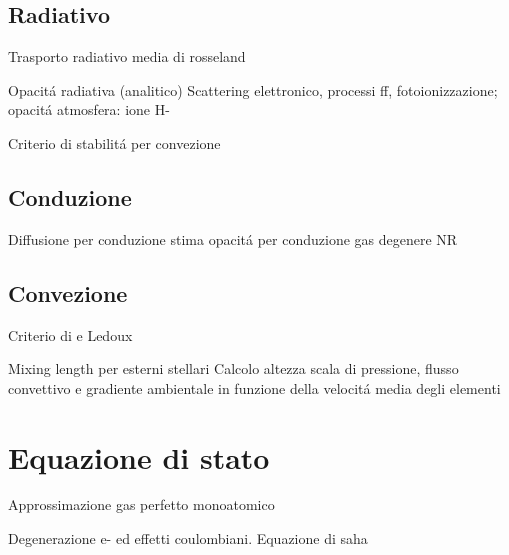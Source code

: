 \subsection{Radiativo}

\begin{frame}{Trasporto radiativo}
media di rosseland
\end{frame}

\begin{frame}{Opacit\'a radiativa (analitico)}
Scattering elettronico, processi ff, fotoionizzazione; opacit\'a atmosfera: ione H-
\end{frame}

\begin{frame}{Criterio di stabilit\'a per convezione}

\end{frame}

\subsection{Conduzione}

\begin{frame}{Diffusione per conduzione}
stima opacit\'a per conduzione gas degenere NR
\end{frame}

\subsection{Convezione}

\begin{frame}{Criterio di \sch e Ledoux}

\end{frame}

\begin{frame}{Mixing length per esterni stellari}
Calcolo altezza scala di pressione, flusso convettivo e gradiente ambientale in funzione della velocit\'a media degli elementi
\end{frame}

\section{Equazione di stato}

\begin{frame}{Approssimazione gas perfetto monoatomico}

\end{frame}

\begin{frame}{Degenerazione e- ed effetti coulombiani. Equazione di saha}

\end{frame}

